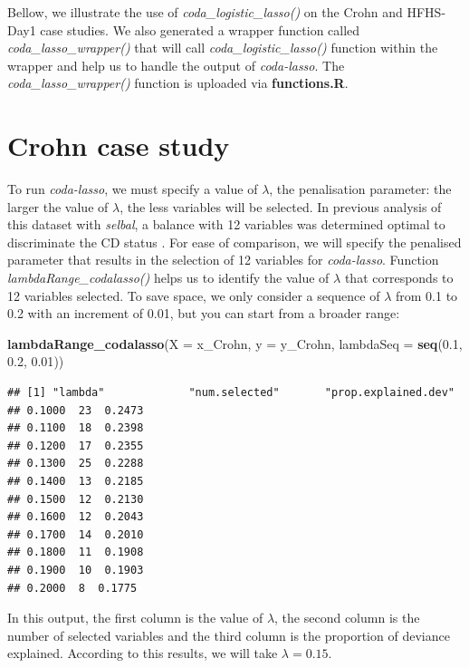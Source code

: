 \documentclass[openany]{book}
\newenvironment{Shaded}{\begin{snugshade}}{\end{snugshade}}
\newcommand{\KeywordTok}[1]{\textcolor[rgb]{0.13,0.29,0.53}{\textbf{#1}}}
\newcommand{\DataTypeTok}[1]{\textcolor[rgb]{0.13,0.29,0.53}{#1}}
\newcommand{\FloatTok}[1]{\textcolor[rgb]{0.00,0.00,0.81}{#1}}
\newcommand{\NormalTok}[1]{#1}
\begin{document}
Bellow, we illustrate the use of \emph{coda\_logistic\_lasso()} on the
Crohn and HFHS-Day1 case studies. We also generated a wrapper function
called \emph{coda\_lasso\_wrapper()} that will call
\emph{coda\_logistic\_lasso()} function within the wrapper and help us
to handle the output of \emph{coda-lasso}. The
\emph{coda\_lasso\_wrapper()} function is uploaded via
\textbf{functions.R}.

\section{Crohn case study}\label{crohn-case-study-2}

To run \emph{coda-lasso}, we must specify a value of \(\lambda\), the
penalisation parameter: the larger the value of \(\lambda\), the less
variables will be selected. In previous analysis of this dataset with
\emph{selbal}, a balance with 12 variables was determined optimal to
discriminate the CD status \citep{rivera2018balances}. For ease of
comparison, we will specify the penalised parameter that results in the
selection of 12 variables for \emph{coda-lasso}. Function
\emph{lambdaRange\_codalasso()} helps us to identify the value of
\(\lambda\) that corresponds to 12 variables selected. To save space, we
only consider a sequence of \(\lambda\) from 0.1 to 0.2 with an
increment of 0.01, but you can start from a broader range:

\begin{Shaded}
\begin{Highlighting}[]
\KeywordTok{lambdaRange_codalasso}\NormalTok{(}\DataTypeTok{X =}\NormalTok{ x_Crohn, }\DataTypeTok{y =}\NormalTok{ y_Crohn, }\DataTypeTok{lambdaSeq =} \KeywordTok{seq}\NormalTok{(}\FloatTok{0.1}\NormalTok{, }\FloatTok{0.2}\NormalTok{, }\FloatTok{0.01}\NormalTok{))}
\end{Highlighting}
\end{Shaded}

\begin{verbatim}
## [1] "lambda"             "num.selected"       "prop.explained.dev"
## 0.1000  23  0.2473
## 0.1100  18  0.2398
## 0.1200  17  0.2355
## 0.1300  25  0.2288
## 0.1400  13  0.2185
## 0.1500  12  0.2130
## 0.1600  12  0.2043
## 0.1700  14  0.2010
## 0.1800  11  0.1908
## 0.1900  10  0.1903
## 0.2000  8  0.1775
\end{verbatim}

In this output, the first column is the value of \(\lambda\), the second
column is the number of selected variables and the third column is the
proportion of deviance explained. According to this results, we will
take \(\lambda = 0.15\).
\end{document}
